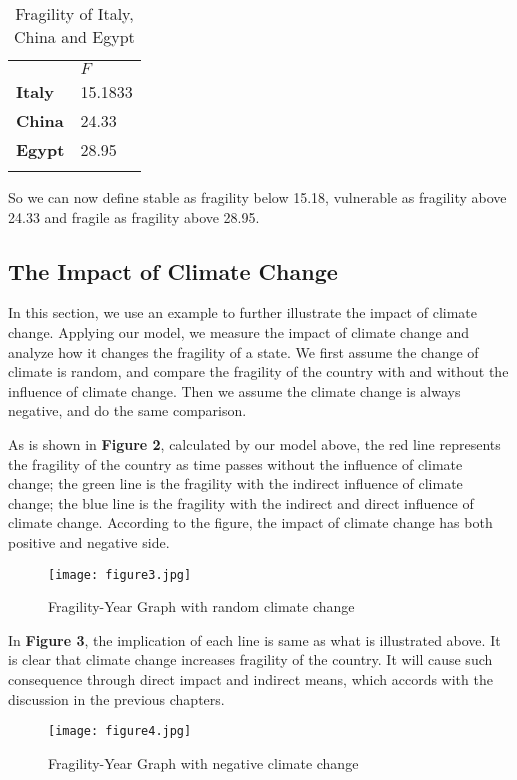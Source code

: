 \documentclass{mcmthesis}
\newlength\savedwidth
\newcommand\whline{\noalign{\global\savedwidth\arrayrulewidth
		\global\arrayrulewidth 1.2pt}%
	\hline
	\noalign{\global\arrayrulewidth\savedwidth}}
\newlength\savewidth
\newcommand\shline{\noalign{\global\savewidth\arrayrulewidth
		\global\arrayrulewidth 1.2pt}%
	\hline
	\noalign{\global\arrayrulewidth\savewidth}}
\begin{document}
	\begin{table}[htbp]
		\renewcommand\arraystretch{1.5}
		\footnotesize
		\centering
		\begin{tabular}{m{2cm}<{\centering}|m{5cm}<{\centering}}
			\whline
			&\textbf{$F$}\\
			\whline
			\textbf{Italy} & 15.1833\\
			
			\textbf{China} & 24.33\\
			
			\textbf{Egypt} & 28.95\\
			
			\shline
		\end{tabular}
		\caption{Fragility of Italy, China and Egypt}\label{tab:Fragility  of Italy, China and Egypt}
	\end{table}
	
	So we can now define stable as fragility below 15.18, vulnerable as fragility above 24.33 and fragile as fragility above 28.95.
	
	\subsection{The Impact of Climate Change}
	
	In this section, we use an example to further illustrate the impact of climate change. Applying our model, we measure the impact of climate change and analyze how it changes the fragility of a state. We first assume the change of climate is random, and compare the fragility of the country with and without the influence of climate change. Then we assume the climate change is always negative, and do the same comparison.
	
	As is shown in \textbf{Figure 2},  calculated by our model above, the red line represents the fragility of the country as time passes without the influence of climate change; the green line is the fragility with the indirect influence of climate change; the blue line is the fragility with the indirect and direct influence of climate change. According to the figure, the impact of climate change has both positive and negative side. 
	\begin{figure}[h]
		\small
		\centering
		\texttt{[image: figure3.jpg]}
		\caption{Fragility-Year Graph with random climate change} \label{fig:Fragility-Year with random climate change}
	\end{figure}

	In \textbf{Figure 3}, the implication of each line is same as what is illustrated above. It is clear that climate change increases fragility of the country. It will cause such consequence through direct impact and indirect means, which accords with the discussion in the previous chapters.
	\begin{figure}[h]
		\small
		\centering
		\texttt{[image: figure4.jpg]}
		\caption{Fragility-Year Graph with negative climate change} \label{fig:Fragility-Year with random climate change}
	\end{figure}
	
\end{document}
